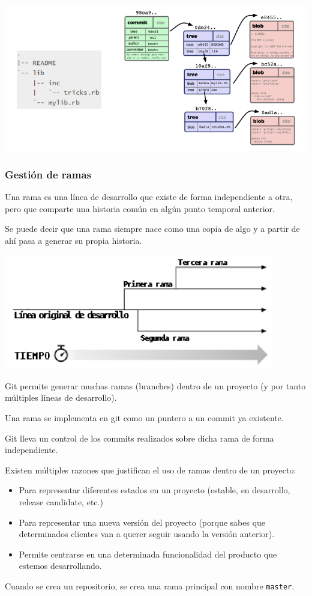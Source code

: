 \begin{center}
	\includegraphics{"Temas/Tema 1/screenshot009"}
\end{center}
\subsubsection*{\hspace{10pt}Gestión de ramas}
Una rama es una línea de desarrollo que existe de forma independiente a otra, pero que comparte una historia común en algún punto temporal anterior.

Se puede decir que una rama siempre nace como una copia de algo y a partir de ahí pasa a generar su propia historia.
\begin{center}
	\includegraphics{"Temas/Tema 1/screenshot010"}
\end{center}
Git permite generar muchas ramas (branches) dentro de un proyecto (y por tanto múltiples líneas de desarrollo).

Una rama se implementa en git como un puntero a un commit ya existente.

Git lleva un control de los commits realizados sobre dicha rama de forma independiente.

Existen múltiples razones que justifican el uso de ramas dentro de un proyecto:
\begin{itemize}
	\item Para representar diferentes estados en un proyecto (estable, en desarrollo, release candidate, etc.)
\item Para representar una nueva versión del proyecto (porque sabes que determinados clientes van a querer seguir usando la versión anterior).
\item Permite centrarse en una determinada funcionalidad del producto que estemos desarrollando.
\end{itemize}
Cuando se crea un repositorio, se crea una rama principal con nombre \texttt{master}.

